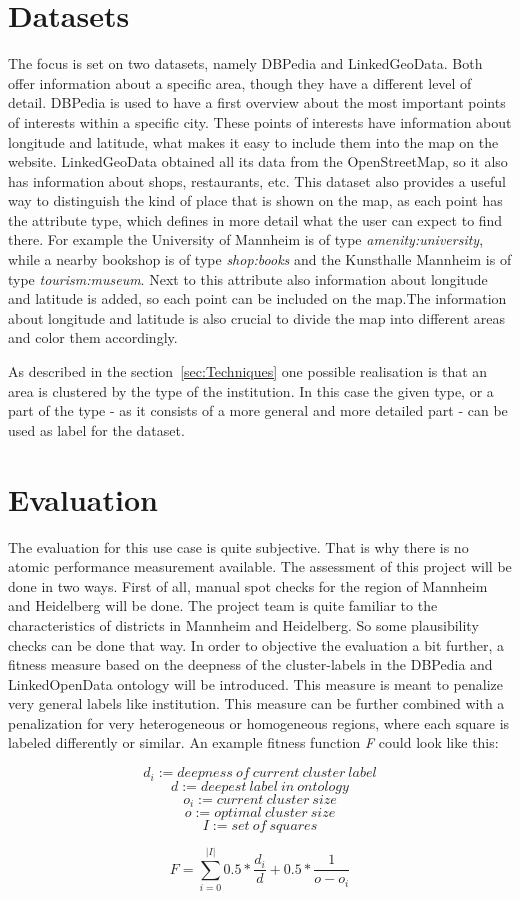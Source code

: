 \section{Datasets}
The focus is set on two datasets, namely DBPedia and LinkedGeoData. Both offer information about a specific area, though they have a different level of detail. DBPedia is used to have a first overview about the most important points of interests within a specific city. These points of interests have information about longitude and latitude, what makes it easy to include them into the map on the website. LinkedGeoData obtained all its data from the OpenStreetMap, so it also has information about shops, restaurants, etc. This dataset also provides a useful way to distinguish the kind of place that is shown on the map, as each point has the attribute type, which defines in more detail what the user can expect to find there. For example the University of Mannheim is of type \textit{amenity:university}, while a nearby bookshop is of type \textit{shop:books} and the Kunsthalle Mannheim is of type \textit{tourism:museum}. Next to this attribute also information about longitude and latitude is added, so each point can be included on the map.The information about longitude and latitude is also crucial to divide the map into different areas and color them accordingly.

As described in the section~\ref{sec:Techniques} one possible realisation is that an area is clustered by the type of the institution. In this case the given type, or a part of the type - as it consists of a more general and more detailed part - can be used as label for the dataset.

\section{Evaluation}

The evaluation for this use case is quite subjective. That is why there is no atomic performance measurement available. The assessment of this project will be done in two ways. First of all, manual spot checks for the region of Mannheim and Heidelberg will be done. The project team is quite familiar to the characteristics of districts in Mannheim and Heidelberg. So some plausibility checks can be done that way. In order to objective the evaluation a bit further, a fitness measure based on the deepness of the cluster-labels in the DBPedia and LinkedOpenData ontology will be introduced. This measure is meant to penalize very general labels like institution. This measure can be further combined with a penalization for very heterogeneous or homogeneous regions, where each square is labeled differently or similar. An example fitness function \textit{F} could look like this:

\[d_i := deepness~of~current~cluster~label \]
\[d := deepest~label~in~ontology \]
\[o_i := current~cluster~size \]
\[o := optimal~cluster~size \]
\[I := set~of~squares \]

\[F = \sum_{i=0}^{|I|} 0.5 * \frac{d_i}{d} + 0.5 * \frac{1}{ o - o_i }\]


